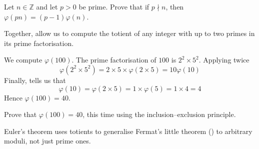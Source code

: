 
\begin{exercise}
Let $n \in \mathbb{Z}$ and let $p>0$ be prime. Prove that if $p \nmid n$, then $\varphi(pn)=(p-1)\varphi(n)$.
\end{exercise}

Together,  allow us to compute the totient of any integer with up to two primes in its prime factorisation.

\begin{example}
\label{exTotientOfOneHundred}
We compute $\varphi(100)$. The prime factorisation of $100$ is $2^2 \times 5^2$. Applying  twice
\[ \varphi(2^2 \times 5^2) = 2 \times 5 \times \varphi(2 \times 5) = 10\varphi(10) \]
Finally,  tells us that
\[ \varphi(10) = \varphi(2 \times 5) = 1 \times \varphi(5) = 1 \times 4 = 4 \]
Hence $\varphi(100) = 40$.
\end{example}

\begin{exercise}
Prove that $\varphi(100)=40$, this time using the inclusion--exclusion principle.
\end{exercise}

Euler's theorem uses totients to generalise Fermat's little theorem () to arbitrary moduli, not just prime ones.

